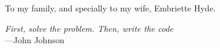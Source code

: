 %
\begin{frontmatter}

%
%
\makefrontmatter

%
%
%
%
%
%
\begin{dedication}
	To my family, and specially to my wife, Embriette Hyde.
\end{dedication}

%
%



%
%

\begin{epigraph}
  \emph{First, solve the problem. Then, write the code}\\
  ---John Johnson
\end{epigraph}

%
\tableofcontents

\renewcommand{\glossarysection}[2][]{
\newpage
\noindent
\centerline{LIST OF ABBREVIATIONS}
\addcontentsline{toc}{chapter}{List of Abbreviations}
}


\end{frontmatter}
